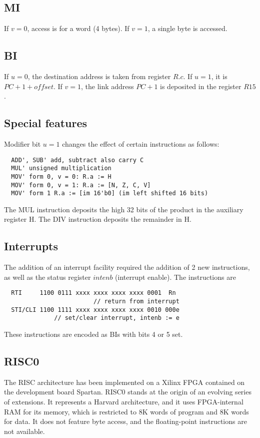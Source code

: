 \subsection{MI}
If $v = 0$, access is for a word (4 bytes). If $v = 1$, a single byte is accessed.

\subsection{BI}
If $u = 0$, the destination address is taken from register $R.c$. If $u = 1$, it is $PC + 1 + offset$. If $v = 1$,
the link address $PC + 1$ is deposited in the register $R15$.

\subsection{Special features}
Modifier bit $u = 1$ changes the effect of certain instructions as follows:
\begin{verbatim}
  ADD', SUB' add, subtract also carry C
  MUL' unsigned multiplication
  MOV' form 0, v = 0: R.a := H
  MOV' form 0, v = 1: R.a := [N, Z, C, V]
  MOV' form 1 R.a := [im 16'b0] (im left shifted 16 bits)
\end{verbatim}

The MUL instruction deposits the high 32 bits of the product in the auxiliary register H. The DIV instruction
deposits the remainder in H.

\subsection{Interrupts}
The addition of an interrupt facility required the addition of 2 new instructions, as well as the status register
$intenb$ (interrupt enable). The instructions are
\begin{verbatim}
  RTI     1100 0111 xxxx xxxx xxxx xxxx 0001  Rn
                         // return from interrupt
  STI/CLI 1100 1111 xxxx xxxx xxxx xxxx 0010 000e
              // set/clear interrupt, intenb := e
\end{verbatim}

These instructions are encoded as BIs with bits 4 or 5 set.

\subsection{RISC0}
The RISC architecture has been implemented on a Xilinx FPGA contained on the development board Spartan. RISC0
stands at the origin of an evolving series of extensions. It represents a Harvard architecture, and it uses
FPGA-internal RAM for its memory, which is restricted to 8K words of program and 8K words for data. It does not
feature byte access, and the floating-point instructions are not available.

